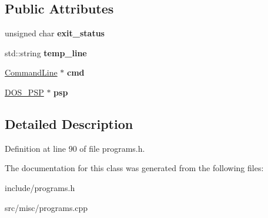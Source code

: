 \subsection*{Public Attributes}
\begin{DoxyCompactItemize}
\item 
\hypertarget{classProgram_a9e1bb1fc1b315bf697fb1872d6defe12}{unsigned char {\bfseries exit\-\_\-status}}\label{classProgram_a9e1bb1fc1b315bf697fb1872d6defe12}

\item 
\hypertarget{classProgram_ade1241ef2184833339588494094f7d4f}{std\-::string {\bfseries temp\-\_\-line}}\label{classProgram_ade1241ef2184833339588494094f7d4f}

\item 
\hypertarget{classProgram_af637f18e9637b148fbecbd3f0bc748fc}{\hyperlink{classCommandLine}{Command\-Line} $\ast$ {\bfseries cmd}}\label{classProgram_af637f18e9637b148fbecbd3f0bc748fc}

\item 
\hypertarget{classProgram_af2f99e812360b3748ec790f4e4023fc4}{\hyperlink{classDOS__PSP}{D\-O\-S\-\_\-\-P\-S\-P} $\ast$ {\bfseries psp}}\label{classProgram_af2f99e812360b3748ec790f4e4023fc4}

\end{DoxyCompactItemize}


\subsection{Detailed Description}


Definition at line 90 of file programs.\-h.



The documentation for this class was generated from the following files\-:\begin{DoxyCompactItemize}
\item 
include/programs.\-h\item 
src/misc/programs.\-cpp\end{DoxyCompactItemize}

